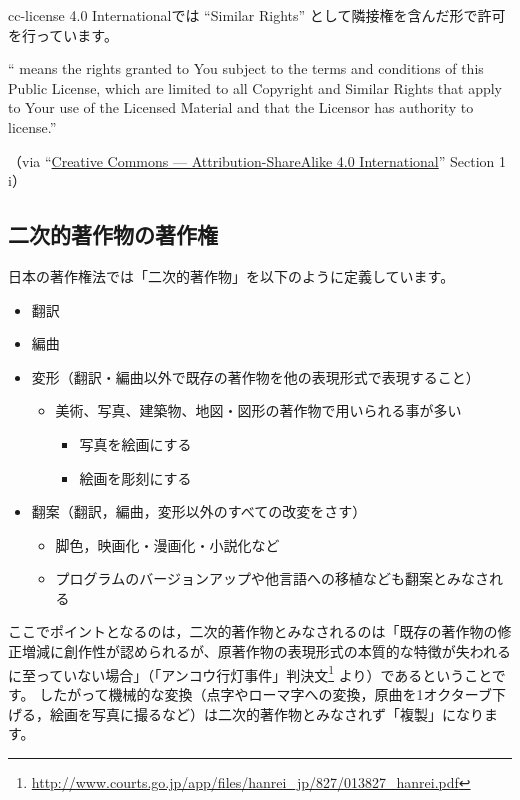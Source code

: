 \documentclass{ltjsarticle}
\renewcommand{\emph}[1]{\textsf{\textgt{#1}}} %
\begin{document}
cc-license 4.0 Internationalでは ``Similar Rights'' として隣接権を含んだ形で許可を行っています。
\begin{mdframed}
 ``\emph{Licensed Rights} means the rights granted to You subject to the terms and conditions of this Public License, which are limited to all Copyright and Similar Rights that apply to Your use of the Licensed Material and that the Licensor has authority to license.'' \par
（via  ``\href{http://creativecommons.org/licenses/by-sa/4.0/legalcode}{Creative Commons — Attribution-ShareAlike 4.0 International}''  Section 1 i）
\end{mdframed}


\subsection{二次的著作物の著作権} \label{sec:adaptations}

日本の著作権法では「二次的著作物」を以下のように定義しています。
\begin{itemize}
\item 翻訳
\item 編曲
\item 変形（翻訳・編曲以外で既存の著作物を他の表現形式で表現すること）
      \begin{itemize}
      \item 美術、写真、建築物、地図・図形の著作物で用いられる事が多い
            \begin{itemize}
            \item 写真を絵画にする
            \item 絵画を彫刻にする
            \end{itemize}
      \end{itemize}
\item 翻案（翻訳，編曲，変形以外のすべての改変をさす）
      \begin{itemize}
      \item 脚色，映画化・漫画化・小説化など
      \item プログラムのバージョンアップや他言語への移植なども翻案とみなされる
      \end{itemize}
\end{itemize}
ここでポイントとなるのは，二次的著作物とみなされるのは「既存の著作物の修正増減に創作性が認められるが、原著作物の表現形式の本質的な特徴が失われるに至っていない場合」（「アンコウ行灯事件」判決文\footnote{\url{http://www.courts.go.jp/app/files/hanrei_jp/827/013827_hanrei.pdf}} より）であるということです。
したがって機械的な変換（点字やローマ字への変換，原曲を1オクターブ下げる，絵画を写真に撮るなど）は二次的著作物とみなされず「複製」になります。
\end{document}
